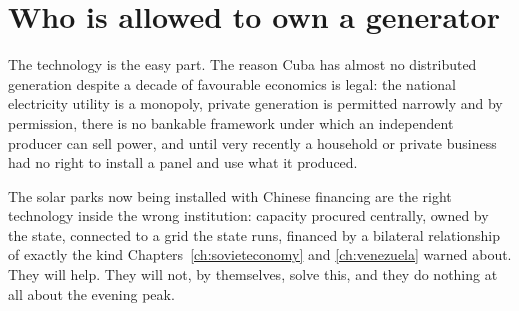 \section{Who is allowed to own a generator}

The technology is the easy part. The reason Cuba has almost no distributed
generation despite a decade of favourable economics is legal: the national
electricity utility is a monopoly, private generation is permitted narrowly and
by permission, there is no bankable framework under which an independent producer
can sell power, and until very recently a household or private business had no
right to install a panel and use what it produced.

The solar parks now being installed with Chinese financing are the right
technology inside the wrong institution: capacity procured centrally, owned by
the state, connected to a grid the state runs, financed by a bilateral
relationship of exactly the kind Chapters~\ref{ch:sovieteconomy} and
\ref{ch:venezuela} warned about. They will help. They will not, by themselves,
solve this, and they do nothing at all about the evening peak.

